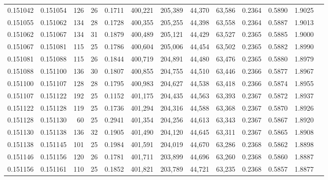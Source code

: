 \begin{tabular}{rrrrrrrrrrrrr}
0.151042 & 0.151054 & 126 &  26 &                                     0.1711 & 400,221 & 205,389 &  44,370 &  63,586 & 0.2364 & 0.5890 & 1.9025 \\
0.151055 & 0.151062 & 134 &  28 &                                     0.1728 & 400,355 & 205,255 &  44,398 &  63,558 & 0.2364 & 0.5887 & 1.9013 \\
0.151062 & 0.151067 & 134 &  31 &                                     0.1879 & 400,489 & 205,121 &  44,429 &  63,527 & 0.2365 & 0.5885 & 1.9000 \\
0.151067 & 0.151081 & 115 &  25 &                                     0.1786 & 400,604 & 205,006 &  44,454 &  63,502 & 0.2365 & 0.5882 & 1.8990 \\
0.151081 & 0.151088 & 115 &  26 &                                     0.1844 & 400,719 & 204,891 &  44,480 &  63,476 & 0.2365 & 0.5880 & 1.8979 \\
0.151088 & 0.151100 & 136 &  30 &                                     0.1807 & 400,855 & 204,755 &  44,510 &  63,446 & 0.2366 & 0.5877 & 1.8967 \\
0.151100 & 0.151107 & 128 &  28 &                                     0.1795 & 400,983 & 204,627 &  44,538 &  63,418 & 0.2366 & 0.5874 & 1.8955 \\
0.151107 & 0.151122 & 192 &  25 &                                     0.1152 & 401,175 & 204,435 &  44,563 &  63,393 & 0.2367 & 0.5872 & 1.8937 \\
0.151122 & 0.151128 & 119 &  25 &                                     0.1736 & 401,294 & 204,316 &  44,588 &  63,368 & 0.2367 & 0.5870 & 1.8926 \\
0.151128 & 0.151130 &  60 &  25 &                                     0.2941 & 401,354 & 204,256 &  44,613 &  63,343 & 0.2367 & 0.5867 & 1.8920 \\
0.151130 & 0.151138 & 136 &  32 &                                     0.1905 & 401,490 & 204,120 &  44,645 &  63,311 & 0.2367 & 0.5865 & 1.8908 \\
0.151138 & 0.151145 & 101 &  25 &                                     0.1984 & 401,591 & 204,019 &  44,670 &  63,286 & 0.2368 & 0.5862 & 1.8898 \\
0.151146 & 0.151156 & 120 &  26 &                                     0.1781 & 401,711 & 203,899 &  44,696 &  63,260 & 0.2368 & 0.5860 & 1.8887 \\
0.151156 & 0.151161 & 110 &  25 &                                     0.1852 & 401,821 & 203,789 &  44,721 &  63,235 & 0.2368 & 0.5857 & 1.8877 \\

\end{tabular}
